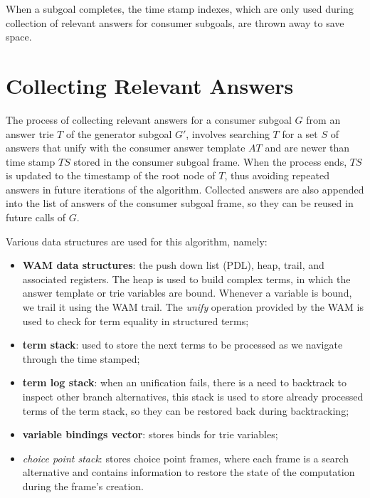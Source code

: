 When a subgoal completes, the time stamp indexes, which are only used
during collection of relevant answers
for consumer subgoals, are thrown away to save space.

\section{Collecting Relevant Answers}\label{sec:collect}

The process of collecting relevant answers for a consumer subgoal $G$ from an answer trie $T$
of the generator subgoal $G'$, involves searching $T$ for a set $S$ of answers that unify
with the consumer answer template $AT$ and are newer than time stamp
$TS$ stored in the consumer subgoal frame.
When the process ends, $TS$ is updated to the
timestamp of the root node of $T$, thus avoiding repeated answers in future iterations
of the algorithm. Collected answers are also appended into the list of answers of the consumer subgoal frame, so they can be reused in future calls of $G$.

Various data structures are used for this algorithm, namely:

\begin{itemize}
  \item \textbf{WAM data structures}: the push down list (PDL),
  heap, trail, and associated registers. The heap is used to build complex terms, in which the
  answer template or trie variables are bound. Whenever a variable is bound, we trail it using the WAM trail. The \textit{unify} operation provided by the WAM is used to check for term equality in structured terms;
  
  \item \textbf{term stack}: used to store the next terms to be processed as we navigate through the time stamped;
  
  \item \textbf{term log stack}: when an unification fails, there is a need to backtrack to inspect other branch alternatives, this stack is used to store already processed terms of the term stack, so they can be restored back during backtracking;
  
  \item \textbf{variable bindings vector}: stores binds for trie variables;
  
  \item \textit{choice point stack}: stores choice point frames, where each frame is a search alternative and contains information to restore the state of the computation during the frame's creation.
  
\end{itemize}

